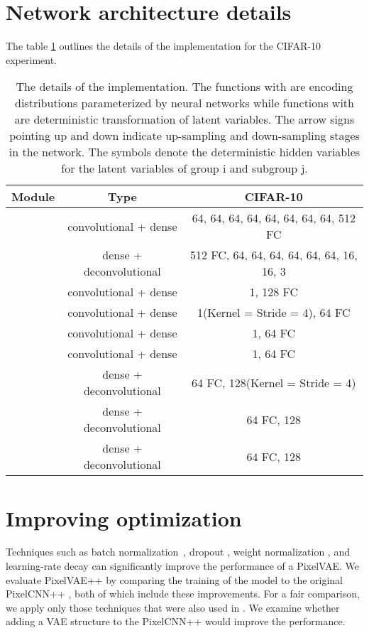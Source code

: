 \documentclass{article}
\newcommand{\uu}{}
\newcommand{\dd}{}
\begin{document}



\newpage
\appendix

\section{Network architecture details}
\label{app:architecture}
The table \ref{table:architecture} outlines the details of the implementation for the CIFAR-10 experiment.

\begin{table}[h]
\centering
\begin{tabular}{ l|c|c}
Module & Type & CIFAR-10 \\
\hline
 & convolutional + dense &  64\dd, 64, 64\dd, 64, 64\dd, 64, 64\dd, 64, 512 FC\\
 & dense + deconvolutional & 512 FC, 64\uu, 64, 64\uu, 64, 64\uu, 64, 16\uu, 16, 3\uu \\
 & convolutional + dense & 1\dd, 128 FC\\
 & convolutional + dense & 1\dd (Kernel = Stride = 4), 64 FC\\
 & convolutional + dense & 1\dd, 64 FC\\
 & convolutional + dense & 1, 64 FC\\
 & dense + deconvolutional & 64 FC, 128\uu (Kernel = Stride = 4)\\
 & dense + deconvolutional & 64 FC, 128\uu\\
 & dense + deconvolutional & 64 FC, 128\\
\end{tabular}
\vspace{0.5cm}
\caption{The details of the implementation. The functions with  are encoding distributions parameterized by neural networks while functions with  are deterministic transformation of latent variables. The arrow signs pointing up and down indicate up-sampling and down-sampling stages in the network. The symbols  denote the deterministic hidden variables for the latent variables of group i and subgroup j.}
\label{table:architecture}
\end{table}

\section{Improving optimization}
Techniques such as batch normalization~\cite{ioffe2015batch}, dropout \cite{srivastava2014dropout}, weight normalization \cite{salimans2016weight}, and learning-rate decay can significantly improve the performance of a PixelVAE. We evaluate PixelVAE++ by comparing the training of the model to the original PixelCNN++ , both of which include these improvements. For a fair comparison, we apply only those techniques that were also used in \cite{salimans2017pixelcnn++}. We examine whether adding a VAE structure to the PixelCNN++ would improve the performance. 
\end{document}
